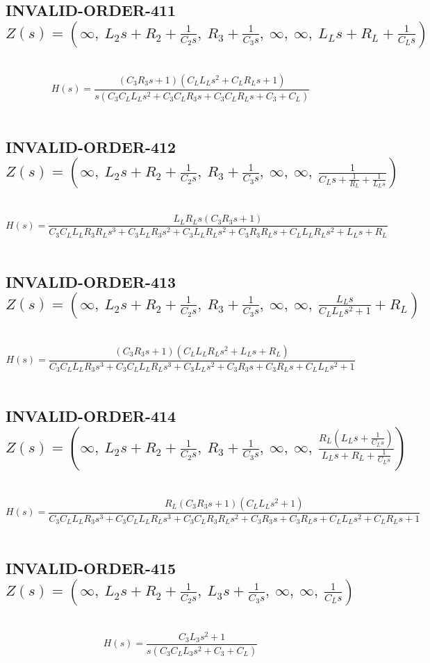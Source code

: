 \documentclass{article}
\begin{document}
\subsection{INVALID-ORDER-411 $Z(s) = \left( \infty, \  L_{2} s + R_{2} + \frac{1}{C_{2} s}, \  R_{3} + \frac{1}{C_{3} s}, \  \infty, \  \infty, \  L_{L} s + R_{L} + \frac{1}{C_{L} s}\right)$ } \ 
\textbf{\[H(s) = \frac{\left(C_{3} R_{3} s + 1\right) \left(C_{L} L_{L} s^{2} + C_{L} R_{L} s + 1\right)}{s \left(C_{3} C_{L} L_{L} s^{2} + C_{3} C_{L} R_{3} s + C_{3} C_{L} R_{L} s + C_{3} + C_{L}\right)}\] } \ 
\subsection{INVALID-ORDER-412 $Z(s) = \left( \infty, \  L_{2} s + R_{2} + \frac{1}{C_{2} s}, \  R_{3} + \frac{1}{C_{3} s}, \  \infty, \  \infty, \  \frac{1}{C_{L} s + \frac{1}{R_{L}} + \frac{1}{L_{L} s}}\right)$ } \ 
\textbf{\[H(s) = \frac{L_{L} R_{L} s \left(C_{3} R_{3} s + 1\right)}{C_{3} C_{L} L_{L} R_{3} R_{L} s^{3} + C_{3} L_{L} R_{3} s^{2} + C_{3} L_{L} R_{L} s^{2} + C_{3} R_{3} R_{L} s + C_{L} L_{L} R_{L} s^{2} + L_{L} s + R_{L}}\] } \ 
\subsection{INVALID-ORDER-413 $Z(s) = \left( \infty, \  L_{2} s + R_{2} + \frac{1}{C_{2} s}, \  R_{3} + \frac{1}{C_{3} s}, \  \infty, \  \infty, \  \frac{L_{L} s}{C_{L} L_{L} s^{2} + 1} + R_{L}\right)$ } \ 
\textbf{\[H(s) = \frac{\left(C_{3} R_{3} s + 1\right) \left(C_{L} L_{L} R_{L} s^{2} + L_{L} s + R_{L}\right)}{C_{3} C_{L} L_{L} R_{3} s^{3} + C_{3} C_{L} L_{L} R_{L} s^{3} + C_{3} L_{L} s^{2} + C_{3} R_{3} s + C_{3} R_{L} s + C_{L} L_{L} s^{2} + 1}\] } \ 
\subsection{INVALID-ORDER-414 $Z(s) = \left( \infty, \  L_{2} s + R_{2} + \frac{1}{C_{2} s}, \  R_{3} + \frac{1}{C_{3} s}, \  \infty, \  \infty, \  \frac{R_{L} \left(L_{L} s + \frac{1}{C_{L} s}\right)}{L_{L} s + R_{L} + \frac{1}{C_{L} s}}\right)$ } \ 
\textbf{\[H(s) = \frac{R_{L} \left(C_{3} R_{3} s + 1\right) \left(C_{L} L_{L} s^{2} + 1\right)}{C_{3} C_{L} L_{L} R_{3} s^{3} + C_{3} C_{L} L_{L} R_{L} s^{3} + C_{3} C_{L} R_{3} R_{L} s^{2} + C_{3} R_{3} s + C_{3} R_{L} s + C_{L} L_{L} s^{2} + C_{L} R_{L} s + 1}\] } \ 
\subsection{INVALID-ORDER-415 $Z(s) = \left( \infty, \  L_{2} s + R_{2} + \frac{1}{C_{2} s}, \  L_{3} s + \frac{1}{C_{3} s}, \  \infty, \  \infty, \  \frac{1}{C_{L} s}\right)$ } \ 
\textbf{\[H(s) = \frac{C_{3} L_{3} s^{2} + 1}{s \left(C_{3} C_{L} L_{3} s^{2} + C_{3} + C_{L}\right)}\] } \ 
\end{document}
